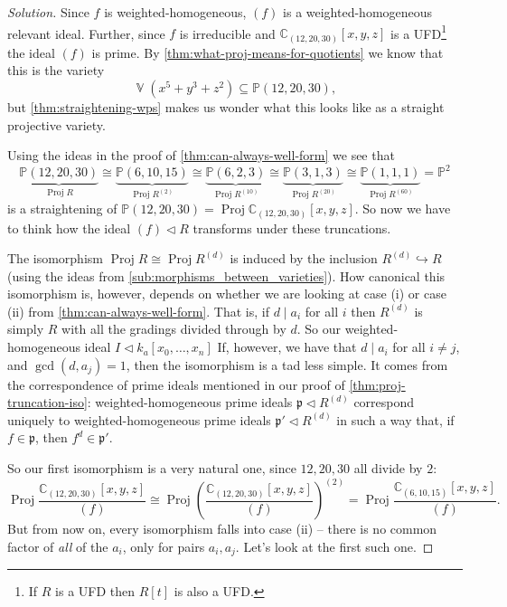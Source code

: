 \documentclass[10pt,notitlepage]{article}
\numberwithin{equation}{subsection}
\DeclareMathOperator{\proj}{Proj}
\DeclareMathOperator{\van}{\mathbb{V}}
\newcommand{\pee}{\mathbb{P}}
\newcommand{\cc}{\mathbb{C}}
\newcommand{\kazn}{k_a[x_0,\ldots,x_n]}
\newcommand{\prid}{\mathfrak{p}}
\begin{document}
    \begin{proof}[Solution]
        Since $f$ is weighted-homogeneous, $(f)$ is a weighted-homogeneous relevant ideal.
        Further, since $f$ is irreducible and $\cc_{(12,20,30)}[x,y,z]$ is a UFD\footnote{%
            If $R$ is a UFD then $R[t]$ is also a UFD.
        } the ideal $(f)$ is prime.
        By \cref{thm:what-proj-means-for-quotients} we know that this is the variety
        \[
            \van(x^5+y^3+z^2)\subseteq\pee(12,20,30),
        \]
        but \cref{thm:straightening-wps} makes us wonder what this looks like as a straight projective variety.

        Using the ideas in the proof of \cref{thm:can-always-well-form} we see that
        \[
            \underbrace{\pee(12,20,30)}_{\proj R} \cong \underbrace{\pee(6,10,15)}_{\proj R^{(2)}} \cong \underbrace{\pee(6,2,3)}_{\proj R^{(10)}} \cong \underbrace{\pee(3,1,3)}_{\proj R^{(20)}} \cong \underbrace{\pee(1,1,1)}_{\proj R^{(60)}}=\pee^2
        \]
        is a straightening of $\pee(12,20,30)=\proj\cc_{(12,20,30)}[x,y,z]$.
        So now we have to think how the ideal $(f)\triangleleft R$ transforms under these truncations.

        The isomorphism $\proj R\cong\proj R^{(d)}$ is induced by the inclusion $R^{(d)}\hookrightarrow R$ (using the ideas from \cref{sub:morphisms_between_varieties}).
        How canonical this isomorphism is, however, depends on whether we are looking at case (i) or case (ii) from \cref{thm:can-always-well-form}.
        That is, if $d\mid a_i$ for all $i$ then $R^{(d)}$ is simply $R$ with all the gradings divided through by $d$.
        So our weighted-homogeneous ideal $I\triangleleft\kazn$
        If, however, we have that $d\mid a_i$ for all $i\neq j$, and $\gcd(d,a_j)=1$, then the isomorphism is a tad less simple.
        It comes from the correspondence of prime ideals mentioned in our proof of \cref{thm:proj-truncation-iso}: weighted-homogeneous prime ideals $\prid\triangleleft R^{(d)}$ correspond uniquely to weighted-homogeneous prime ideals $\prid'\triangleleft R^{(d)}$ in such a way that, if $f\in \prid$, then $f^d\in \prid'$.

        So our first isomorphism is a very natural one, since $12,20,30$ all divide by $2$:
        \[
            \proj\frac{\cc_{(12,20,30)}[x,y,z]}{(f)} \cong \proj\left(\frac{\cc_{(12,20,30)}[x,y,z]}{(f)}\right)^{(2)} = \proj\frac{\cc_{(6,10,15)}[x,y,z]}{(f)}.
        \]
        But from now on, every isomorphism falls into case (ii) -- there is no common factor of \emph{all} of the $a_i$, only for pairs $a_i,a_j$.
        Let's look at the first such one.


\end{proof}
\end{document}
